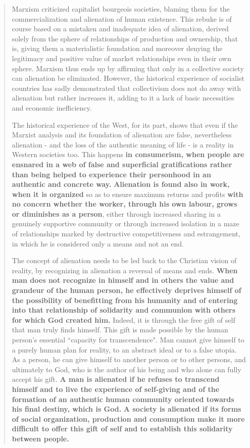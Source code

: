\documentclass[letterpaper]{article}
\begin{document}
\begin{quote}
  Marxism criticized capitalist bourgeois societies, blaming them for the commercialization and alienation of human existence. This rebuke is of course based on a mistaken and inadequate idea of alienation, derived solely from the sphere of relationships of production and ownership, that is, giving them a materialistic foundation and moreover denying the legitimacy and positive value of market relationships even in their own sphere. Marxism thus ends up by affirming that only in a collective society can alienation be eliminated. However, the historical experience of socialist countries has sadly demonstrated that collectivism does not do away with alienation but rather increases it, adding to it a lack of basic necessities and economic inefficiency.

  The historical experience of the West, for its part, shows that even if the Marxist analysis and its foundation of alienation are false, nevertheless alienation - and the loss of the authentic meaning of life - is a reality in Western societies too. This happens \textbf{in consumerism, when people are ensnared in a web of false and superficial gratifications rather than being helped to experience their personhood in an authentic and concrete way.} \textbf{Alienation is found also in work, when it is organized} so as to ensure maximum returns and profits \textbf{with no concern whether the worker, through his own labour, grows or diminishes as a person}, either through increased sharing in a genuinely supportive community or through increased isolation in a maze of relationships marked by destructive competitiveness and estrangement, in which he is considered only a means and not an end.

  The concept of alienation needs to be led back to the Christian vision of reality, by recognizing in alienation a reversal of means and ends. \textbf{When man does not recognize in himself and in others the value and grandeur of the human person, he effectively deprives himself of the possibility of benefitting from his humanity and of entering into that relationship of solidarity and communion with others for which God created him.} Indeed, it is through the free gift of self that man truly finds himself. This gift is made possible by the human person's essential ``capacity for transcendence". Man cannot give himself to a purely human plan for reality, to an abstract ideal or to a false utopia. As a person, he can give himself to another person or to other persons, and ultimately to God, who is the author of his being and who alone can fully accept his gift. \textbf{A man is alienated if he refuses to transcend himself and to live the experience of self-giving and of the formation of an authentic human community oriented towards his final destiny, which is God.} \textbf{A society is alienated if its forms of social organization, production and consumption make it more difficult to offer this gift of self and to establish this solidarity between people.}
\end{quote}
\end{document}
